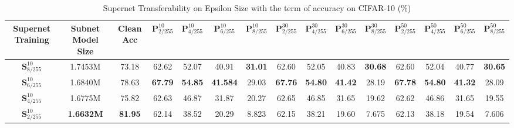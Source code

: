\documentclass[journal]{IEEEtran}
\begin{document}
\begin{table*}[ht]
    \centering
    \setlength{\tabcolsep}{0.5mm}
    \caption{Supernet Transferability on Epsilon Size with the term of accuracy on CIFAR-10 (\%)}
    \begin{tabular}{c|c|c|cccccccccccc}
    Supernet Training& Subnet Model Size & Clean Acc & $\textbf{P}_{2/255}^{10}$ & $\textbf{P}_{4/255}^{10}$ & $\textbf{P}_{6/255}^{10}$ & $\textbf{P}_{8/255}^{10}$ & $\textbf{P}_{2/255}^{30}$ & $\textbf{P}_{4/255}^{30}$ & $\textbf{P}_{6/255}^{30}$ & $\textbf{P}_{8/255}^{30}$ & $\textbf{P}_{2/255}^{50}$ & $\textbf{P}_{4/255}^{50}$ & $\textbf{P}_{6/255}^{50}$ & $\textbf{P}_{8/255}^{50}$\\
    \hline
    $\textbf{S}_{8/255}^{10}$ & 1.7453M & 73.18 & 62.62 & 52.07 & 40.91 & \textbf{31.01} & 62.60 & 52.05 & 40.83 & \textbf{30.68} & 62.60 & 52.04 & 40.77 & \textbf{30.65} \\
    \hline
    $\textbf{S}_{6/255}^{10}$ & 1.6840M & 78.63 & \textbf{67.79} & \textbf{54.85} & \textbf{41.584} & 29.03 & \textbf{67.76} & \textbf{54.80} & \textbf{41.42} & 28.19 & \textbf{67.78} & \textbf{54.80} & \textbf{41.32}  & 28.09 \\
    \hline
    $\textbf{S}_{4/255}^{10}$ & 1.6775M & 75.82 & 62.63 & 46.87 & 31.87 & 20.27 & 62.65 & 46.85 & 31.65 & 19.62 & 62.62 & 46.86 & 31.65 & 19.55 \\
    \hline
    $\textbf{S}_{2/255}^{10}$ & \textbf{1.6632M} & \textbf{81.95} & 62.14 & 38.52 & 20.29 & 8.823 & 62.15 & 38.21 & 19.60 & 7.675 & 62.13 & 38.18 & 19.54 & 7.606 \\
    \hline
    \end{tabular}\label{tab:supernet_transferability_epsilon_size}
\end{table*}
\end{document}
